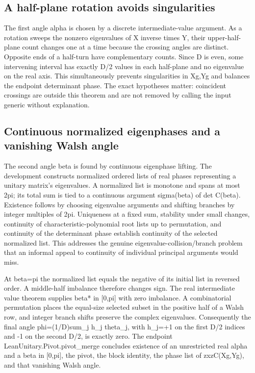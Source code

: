 \documentclass[11pt,a4paper]{article}
\begin{document}
\subsection{A half-plane rotation avoids singularities}
The first angle alpha is chosen by a discrete intermediate-value argument. As a rotation sweeps the nonzero eigenvalues of X inverse times Y, their upper-half-plane count changes one at a time because the crossing angles are distinct. Opposite ends of a half-turn have complementary counts. Since D is even, some intervening interval has exactly D/2 values in each half-plane and no eigenvalue on the real axis. This simultaneously prevents singularities in Xg,Yg and balances the endpoint determinant phase. The exact hypotheses matter: coincident crossings are outside this theorem and are not removed by calling the input generic without explanation.

\subsection{Continuous normalized eigenphases and a vanishing Walsh angle}
The second angle beta is found by continuous eigenphase lifting. The development constructs normalized ordered lists of real phases representing a unitary matrix's eigenvalues. A normalized list is monotone and spans at most 2pi; its total sum is tied to a continuous argument sigma(beta) of det C(beta). Existence follows by choosing eigenvalue arguments and shifting branches by integer multiples of 2pi. Uniqueness at a fixed sum, stability under small changes, continuity of characteristic-polynomial root lists up to permutation, and continuity of the determinant phase establish continuity of the selected normalized list. This addresses the genuine eigenvalue-collision/branch problem that an informal appeal to continuity of individual principal arguments would miss.

At beta=pi the normalized list equals the negative of its initial list in reversed order. A middle-half imbalance therefore changes sign. The real intermediate value theorem supplies beta* in [0,pi] with zero imbalance. A combinatorial permutation places the equal-size selected subset in the positive half of a Walsh row, and integer branch shifts preserve the complex eigenvalues. Consequently the final angle phi=(1/D)sum\_j h\_j theta\_j, with h\_j=+1 on the first D/2 indices and -1 on the second D/2, is exactly zero. The endpoint LeanUnitary.Pivot.pivot\_merge concludes existence of an unrestricted real alpha and a beta in [0,pi], the pivot, the block identity, the phase list of zxzC(Xg,Yg), and that vanishing Walsh angle.
\end{document}
